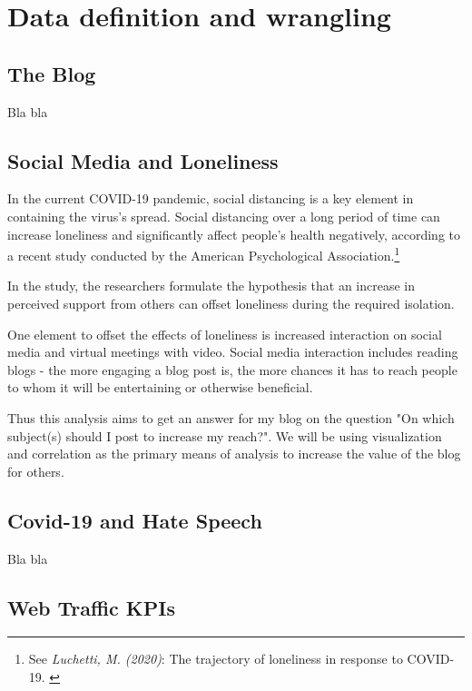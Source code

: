 %
%

\pagebreak
\section{Data definition and wrangling}

\onehalfspacing

\subsection{The Blog}

Bla bla

\subsection{Social Media and Loneliness}

In the current COVID-19 pandemic, social distancing is a key element in containing the virus's spread. Social distancing over a long period of time can increase loneliness and significantly affect people's health negatively, according to a recent study conducted by the American Psychological Association.\footnote{See \textit{Luchetti, M. (2020)}: The trajectory of loneliness in response to COVID-19. \cite{apaLoneliness}}

In the study, the researchers formulate the hypothesis that an increase in perceived support from others can offset loneliness during the required isolation.

One element to offset the effects of loneliness is increased interaction on social media and virtual meetings with video. Social media interaction includes reading blogs - the more engaging a blog post is, the more chances it has to reach people to whom it will be entertaining or otherwise beneficial.

Thus this analysis aims to get an answer for my blog on the question "On which subject(s) should I post to increase my reach?". We will be using visualization and correlation as the primary means of analysis to increase the value of the blog for others.

\subsection{Covid-19 and Hate Speech}

Bla bla

\subsection{Web Traffic KPIs}

